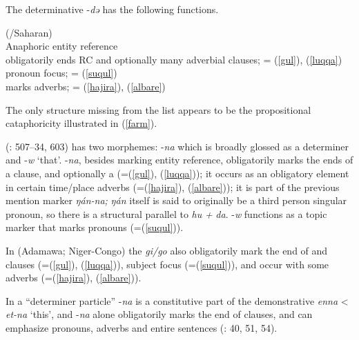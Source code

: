 \documentclass[output=paper]{langsci/langscibook}
\begin{document}
The  determinative -\textit{də} has the following functions.


\ea\label{kanuri}
{}{}{ (/Saharan)}\\

{}{}{Anaphoric entity reference}\\
  \ea
{}{}{obligatorily ends RC and optionally many adverbial clauses}; = (\ref{gul}), (\ref{luqqa})\\
\ex
{}{}{pronoun focus}; = (\ref{suqul})\\
\ex
{}{}{marks adverbs}; = (\ref{hajira}), (\ref{albare})\\
\z
\z

The only  structure missing from the list appears to be the propositional cataphoricity illustrated in (\ref{farm}).

 (\citealt{Frajzyngier2012}: 507–34, 603) has two morphemes: -\textit{na} which is broadly glossed as a determiner and -\textit{w} ‘that’. -\textit{na}, besides marking entity reference, obligatorily marks the ends of a  clause, and optionally a  (=(\ref{gul}), (\ref{luqqa})); it occurs as an obligatory element in certain time/place adverbs (=(\ref{hajira}), (\ref{albare})); it is part of the previous mention marker \textit{ŋán-na;} \textit{ŋán} itself is said to originally be a third person singular pronoun, so there is a structural parallel to \textit{hu} \textit{+} \textit{da}. -\textit{w} functions as a topic marker that marks pronouns (=(\ref{suqul})).

In  (Adamawa; Niger-Congo) the  \textit{gi/go} also obligatorily mark the end of  and  clauses (=(\ref{gul}), (\ref{luqqa})), subject focus (=(\ref{suqul})), and occur with some adverbs (=(\ref{hajira}), (\ref{albare})).

In  a “determiner particle” -\textit{na} is a constitutive part of the demonstrative \textit{enna} < \textit{et-na} ‘this’, and -\textit{na} alone obligatorily marks the end of  clauses, and can emphasize pronouns, adverbs and entire sentences (\citealt{Stevenson1969}: 40, 51, 54).
\end{document}
